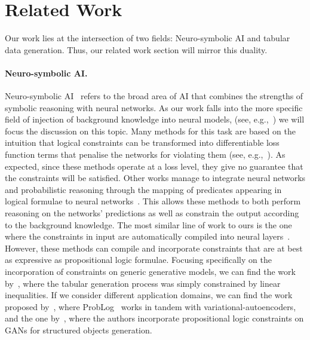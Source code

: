 \section{Related Work}
Our work lies at the intersection of two fields: Neuro-symbolic AI and tabular data generation. Thus, our related work section will mirror this duality.

\paragraph{Neuro-symbolic AI.} Neuro-symbolic AI~\citep{raedt_survey,third_wave} refers to the broad area of AI
that combines the strengths of symbolic reasoning with neural networks. %
As our work falls into the more specific field of injection of background knowledge into neural models, (see, e.g.,~\citep{stewart2017,
hoernle2022multiplexnet,giunchiglia2023manifesto,daniele2023_refining,calanzone2024logicallyconsistentlanguagemodels}) we will focus the discussion on this topic.
Many methods for this task are based on the intuition that logical constraints can be transformed into differentiable loss function terms that penalise the networks for violating them (see, e.g.,~\citep{xu2018semantic,serafini2022ltn,diligenti2012SBR,fischer2019DL2}). As expected, since these methods operate at a loss level, they give no guarantee that the constraints will be satisfied. Other works manage to integrate neural networks and probabilistic reasoning through the mapping of predicates appearing in logical formulae to neural networks~\citep{manhaeve2018deepproblog,yang2020neurasp,sachan2018nuts_and_bolts,pryor2023NeuPSL,krieken2023anesi}. This allows these methods to both perform reasoning on the networks' predictions as well as constrain the output according to the background knowledge. The most similar line of work to ours is the one where the constraints in input are automatically compiled into neural layers~\citep{giunchiglia2021jair,ahmed2022spl,giunchiglia2024ccn+}. However, these methods can compile and incorporate constraints that are at best as expressive as propositional logic formulae. %
Focusing specifically on the incorporation of constraints on generic generative models, we can find the work by~\cite{stoian2024}, where the tabular generation process was simply constrained by linear inequalities. If we consider different application domains, we can find the work proposed by~\cite{misino2023tvael}, where ProbLog~\citep{Raed2007_problog} works in tandem with variational-autoencoders, and the one by~\cite{liello2020}, where the authors incorporate propositional logic constraints on GANs for structured objects generation. %

